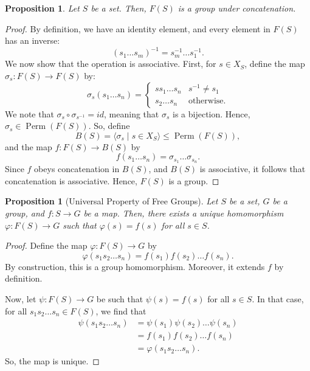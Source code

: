 \documentclass[a4paper, openany]{memoir}
\theoremstyle{definition}
\theoremstyle{plain}
\newtheorem{proposition}[definition]{Proposition}
\begin{document}
    \begin{proposition}
        Let $S$ be a set. Then, $F(S)$ is a group under concatenation.
    \end{proposition}
    \begin{proof}
        By definition, we have an identity element, and every element in $F(S)$ has an inverse:
        \[(s_1 \dots s_m)^{-1} = s_m^{-1} \dots s_1^{-1}.\]
        We now show that the operation is associative. First, for $s \in X_S$, define the map $\sigma_s \colon F(S) \to F(S)$ by:
        \[\sigma_s(s_1 \dots s_n) = \begin{cases}
            s s_1 \dots s_n & s^{-1} \neq s_1 \\
            s_2 \dots s_n & \textrm{otherwise}.
        \end{cases}\]
        We note that $\sigma_s \circ \sigma_{s^{-1}} = id$, meaning that $\sigma_s$ is a bijection. Hence, $\sigma_s \in \operatorname{Perm} (F(S))$. So, define
        \[B(S) = \langle \sigma_s \mid s \in X_S \rangle \leq \operatorname{Perm} (F(S)),\]
        and the map $f \colon F(S) \to B(S)$ by
        \[f(s_1 \dots s_n) = \sigma_{s_1} \dots \sigma_{s_n}.\]
        Since $f$ obeys concatenation in $B(S)$, and $B(S)$ is associative, it follows that concatenation is associative. Hence, $F(S)$ is a group.
    \end{proof}

    \begin{proposition}[Universal Property of Free Groups]
        Let $S$ be a set, $G$ be a group, and $f: S \to G$ be a map. Then, there exists a unique homomorphism $\varphi: F(S) \to G$ such that $\varphi(s) = f(s)$ for all $s \in S$.
    \end{proposition}
    \begin{proof}
        Define the map $\varphi \colon F(S) \to G$ by 
        \[\varphi(s_1 s_2 \dots s_n) = f(s_1) f(s_2) \dots f(s_n).\]
        By construction, this is a group homomorphism. Moreover, it extends $f$ by definition.

        Now, let $\psi \colon F(S) \to G$ be such that $\psi(s) = f(s)$ for all $s \in S$. In that case, for all $s_1 s_2 \dots s_n \in F(S)$, we find that
        \begin{align*}
            \psi(s_1 s_2 \dots s_n) &= \psi(s_1) \psi(s_2) \dots \psi(s_n) \\
            &= f(s_1) f(s_2) \dots f(s_n) \\
            &= \varphi(s_1 s_2 \dots s_n).
        \end{align*}
        So, the map is unique.
    \end{proof}
\end{document}
